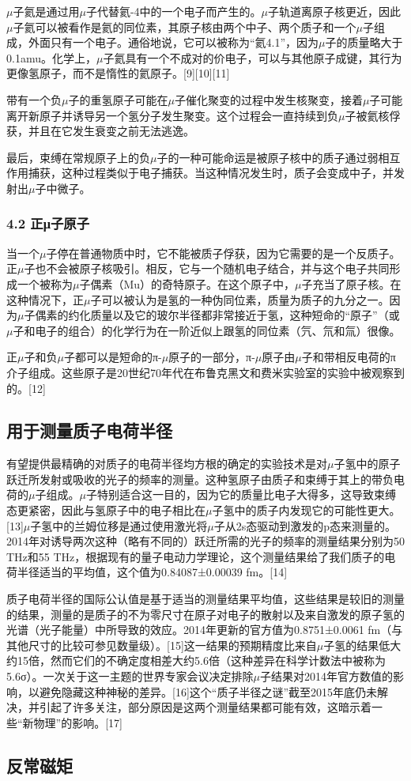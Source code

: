 $\mu$子氦是通过用$\mu$子代替氦-4中的一个电子而产生的。$\mu$子轨道离原子核更近，因此$\mu$子氦可以被看作是氦的同位素，其原子核由两个中子、两个质子和一个$\mu$子组成，外面只有一个电子。通俗地说，它可以被称为“氦4.1”，因为$\mu$子的质量略大于0.1amu。化学上，$\mu$子氦具有一个不成对的价电子，可以与其他原子成键，其行为更像氢原子，而不是惰性的氦原子。[9][10][11]

带有一个负$\mu$子的重氢原子可能在$\mu$子催化聚变的过程中发生核聚变，接着$\mu$子可能离开新原子并诱导另一个氢分子发生聚变。这个过程会一直持续到负$\mu$子被氦核俘获，并且在它发生衰变之前无法逃逸。

最后，束缚在常规原子上的负$\mu$子的一种可能命运是被原子核中的质子通过弱相互作用捕获，这种过程类似于电子捕获。当这种情况发生时，质子会变成中子，并发射出$\mu$子中微子。
\subsubsection{4.2 正μ子原子}
当一个$\mu$子停在普通物质中时，它不能被质子俘获，因为它需要的是一个反质子。正$\mu$子也不会被原子核吸引。相反，它与一个随机电子结合，并与这个电子共同形成一个被称为$\mu$子偶素（Mu）的奇特原子。在这个原子中，$\mu$子充当了原子核。在这种情况下，正$\mu$子可以被认为是氢的一种伪同位素，质量为质子的九分之一。因为$\mu$子偶素的约化质量以及它的玻尔半径都非常接近于氢，这种短命的“原子”（或$\mu$子和电子的组合）的化学行为在一阶近似上跟氢的同位素（氕、氘和氚）很像。

正$\mu$子和负$\mu$子都可以是短命的π-$\mu$原子的一部分，π-$\mu$原子由$\mu$子和带相反电荷的π介子组成。这些原子是20世纪70年代在布鲁克黑文和费米实验室的实验中被观察到的。[12]
\subsection{用于测量质子电荷半径}
有望提供最精确的对质子的电荷半径均方根的确定的实验技术是对$\mu$子氢中的原子跃迁所发射或吸收的光子的频率的测量。这种氢原子由质子和束缚于其上的带负电荷的$\mu$子组成。$\mu$子特别适合这一目的，因为它的质量比电子大得多，这导致束缚态更紧密，因此与氢原子中的电子相比在$\mu$子氢中的质子内发现它的可能性更大。[13]$\mu$子氢中的兰姆位移是通过使用激光将$\mu$子从2s态驱动到激发的p态来测量的。2014年对诱导两次这种（略有不同的）跃迁所需的光子的频率的测量结果分别为50 THz和55 THz，根据现有的量子电动力学理论，这个测量结果给了我们质子的电荷半径适当的平均值，这个值为0.84087±0.00039 fm。[14]

质子电荷半径的国际公认值是基于适当的测量结果平均值，这些结果是较旧的测量的结果，测量的是质子的不为零尺寸在原子对电子的散射以及来自激发的原子氢的光谱（光子能量）中所导致的效应。2014年更新的官方值为0.8751±0.0061 fm（与其他尺寸的比较可参见数量级）。[15]这一结果的预期精度比来自$\mu$子氢的结果低大约15倍，然而它们的不确定度相差大约5.6倍（这种差异在科学计数法中被称为5.6σ）。一次关于这一主题的世界专家会议决定排除$\mu$子结果对2014年官方数值的影响，以避免隐藏这种神秘的差异。[16]这个“质子半径之谜”截至2015年底仍未解决，并引起了许多关注，部分原因是这两个测量结果都可能有效，这暗示着一些“新物理”的影响。[17]
\subsection{反常磁矩}